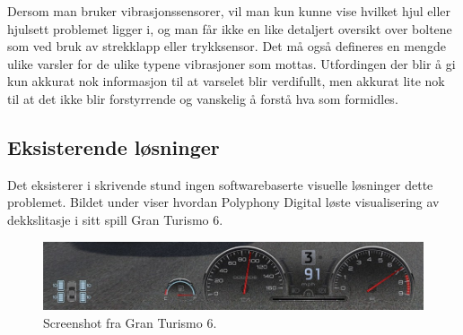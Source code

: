 Dersom man bruker vibrasjonssensorer, vil man kun kunne vise hvilket hjul eller 
hjulsett problemet ligger i, og man får ikke en like detaljert oversikt over 
boltene som ved bruk av strekklapp eller trykksensor. Det må også defineres 
en mengde ulike varsler for de ulike typene vibrasjoner som mottas. 
Utfordingen der blir å gi kun akkurat nok informasjon til at varselet blir 
verdifullt, men akkurat lite nok til at det ikke blir forstyrrende og vanskelig 
å forstå hva som formidles.

\subsection{Eksisterende løsninger}
Det eksisterer i skrivende stund ingen softwarebaserte visuelle løsninger dette 
problemet. Bildet under viser hvordan Polyphony Digital løste visualisering av 
dekkslitasje i sitt spill Gran Turismo 6. 
	\newline
		\begin{figure}[H]
			\centering
			\includegraphics[width=1.00\textwidth]{images/gran-turismo-6-screenshot.jpg}
			\caption{Screenshot fra Gran Turismo 6.}
		\end{figure}
